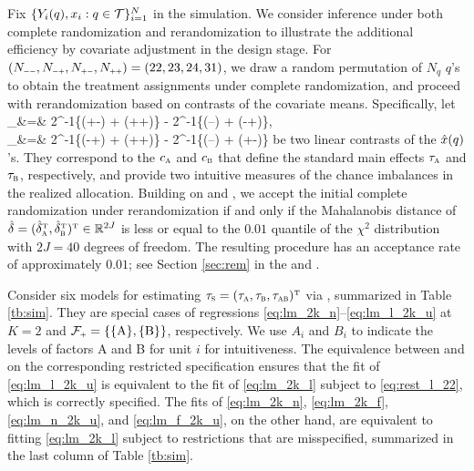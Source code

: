 \documentclass[11pt]{article}
\theoremstyle{definition}
\begin{document}
Fix $\{Y_i(q), x_i: q\in\mathcal{T}\}_{i=1}^N$  in the simulation.
We consider inference under both complete randomization and rerandomization to illustrate the additional efficiency by covariate adjustment in the design stage.
For $(N_{\mmm\mmm}, N_{\mmm\pp}, N_{\pp\mmm}, N_{\pp\pp}) = (22, 23, 24, 31)$, we draw a random permutation of $N_q$ $q$'s to obtain the treatment assignments under complete randomization, and proceed with rerandomization based on contrasts of the covariate means. 
Specifically, let 
\begina
\hd_\A &=& 2^{-1}\{\hx(+-) + \hx(++)\} - 2^{-1}\{\hx(--) + \hx(-+)\},\\
\hd_\B &=& 2^{-1}\{\hx(-+) + \hx(++)\} - 2^{-1}\{\hx(--) + \hx(+-)\}
\enda
be two linear contrasts of the $\hat x(q)$'s. 
They correspond to the $c_{\textsc{a}}$ and $c_{\textsc{b}}$ that define the standard main effects $\tau_{\textsc{a}}$ and $\tau_{\textsc{b}}$, respectively, and provide two intuitive measures of the chance imbalances in the realized allocation. 
Building on \cite{branson} and \cite{AOS}, we accept the initial complete randomization under rerandomization if and only if the Mahalanobis distance of 
$\hat\delta = (\hat\delta_{\textsc{a}}^{ \mathrm{\scriptscriptstyle T} }, \hat\delta_{\textsc{b}}^{ \mathrm{\scriptscriptstyle T} })^{ \mathrm{\scriptscriptstyle T} } \in \mathbb R^{2J}$
is less or equal to the $0.01$ quantile of the $\chi^2$ distribution with $2J=40$ degrees of freedom.
The resulting procedure has an acceptance rate of approximately $0.01$; see Section \ref{sec:rem} in the {\sm} and \cite{AOS}.


Consider six models for estimating $\tau_{\textsc{s}} =   (\tau_{\textsc{a}},\tau_{\textsc{b}} , \tau_{\textsc{ab}})^{ \mathrm{\scriptscriptstyle T} }$ via \ols, summarized in Table \ref{tb:sim}.
They are special cases of regressions \eqref{eq:lm_2k_n}--\eqref{eq:lm_l_2k_u} at $K = 2$ and $\mfp = \{\{\textup A\}, \{\textup B \}\}$, respectively. 
We use $A_i$ and $B_i$ to indicate the levels of factors A and B for unit $i$ for intuitiveness.  The equivalence between \rlss and \olss on the corresponding restricted specification ensures that the \olss fit of \eqref{eq:lm_l_2k_u} is equivalent to the \rlss fit of \eqref{eq:lm_2k_l} subject to \eqref{eq:rest_l_22},  which is correctly specified. 
The \olss fits of  \eqref{eq:lm_2k_n}, \eqref{eq:lm_2k_f}, \eqref{eq:lm_n_2k_u}, and \eqref{eq:lm_f_2k_u}, on the other hand, are equivalent to fitting \eqref{eq:lm_2k_l} subject to restrictions that are misspecified, summarized in the last column of Table \ref{tb:sim}.
\end{document}
